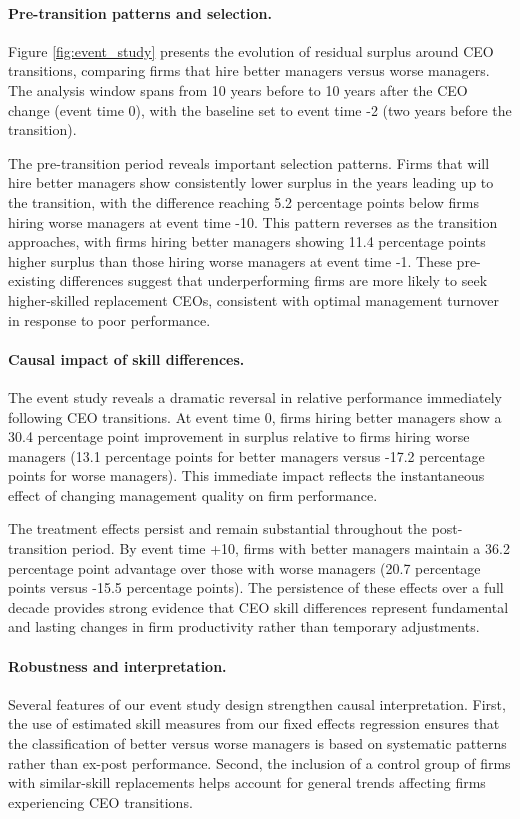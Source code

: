 \documentclass[11pt,a4paper]{article}
\begin{document}
\paragraph{Pre-transition patterns and selection.} Figure \ref{fig:event_study} presents the evolution of residual surplus around CEO transitions, comparing firms that hire better managers versus worse managers. The analysis window spans from 10 years before to 10 years after the CEO change (event time 0), with the baseline set to event time -2 (two years before the transition).

The pre-transition period reveals important selection patterns. Firms that will hire better managers show consistently lower surplus in the years leading up to the transition, with the difference reaching 5.2 percentage points below firms hiring worse managers at event time -10. This pattern reverses as the transition approaches, with firms hiring better managers showing 11.4 percentage points higher surplus than those hiring worse managers at event time -1. These pre-existing differences suggest that underperforming firms are more likely to seek higher-skilled replacement CEOs, consistent with optimal management turnover in response to poor performance.

\paragraph{Causal impact of skill differences.} The event study reveals a dramatic reversal in relative performance immediately following CEO transitions. At event time 0, firms hiring better managers show a 30.4 percentage point improvement in surplus relative to firms hiring worse managers (13.1 percentage points for better managers versus -17.2 percentage points for worse managers). This immediate impact reflects the instantaneous effect of changing management quality on firm performance.

The treatment effects persist and remain substantial throughout the post-transition period. By event time +10, firms with better managers maintain a 36.2 percentage point advantage over those with worse managers (20.7 percentage points versus -15.5 percentage points). The persistence of these effects over a full decade provides strong evidence that CEO skill differences represent fundamental and lasting changes in firm productivity rather than temporary adjustments.

\paragraph{Robustness and interpretation.} Several features of our event study design strengthen causal interpretation. First, the use of estimated skill measures from our fixed effects regression ensures that the classification of better versus worse managers is based on systematic patterns rather than ex-post performance. Second, the inclusion of a control group of firms with similar-skill replacements helps account for general trends affecting firms experiencing CEO transitions.
\end{document}
